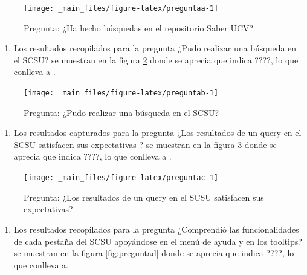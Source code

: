 \documentclass[
  12pt,
  openany]{book}
\providecommand{\tightlist}{%
  \setlength{\itemsep}{0pt}\setlength{\parskip}{0pt}}
\begin{document}
\begin{figure}

{\centering \texttt{[image: \_main\_files/figure-latex/preguntaa-1]} 

}

\caption{Pregunta: ¿Ha hecho búsquedas en el repositorio Saber UCV?}\label{fig:preguntaa}
\end{figure}

\begin{enumerate}
\def\labelenumi{\arabic{enumi}.}
\setcounter{enumi}{1}
\tightlist
\item
  Los resultados recopilados para la pregunta ¿Pudo realizar una búsqueda en el SCSU? se muestran en la figura \ref{fig:preguntab} donde se aprecia que indica ????, lo que conlleva a .
\end{enumerate}

\begin{figure}

{\centering \texttt{[image: \_main\_files/figure-latex/preguntab-1]} 

}

\caption{Pregunta: ¿Pudo realizar una búsqueda en el SCSU?}\label{fig:preguntab}
\end{figure}

\begin{enumerate}
\def\labelenumi{\arabic{enumi}.}
\setcounter{enumi}{2}
\tightlist
\item
  Los resultados capturados para la pregunta ¿Los resultados de un query en el SCSU satisfacen sus expectativas ? se muestran en la figura \ref{fig:preguntac} donde se aprecia que indica ????, lo que conlleva a .
\end{enumerate}

\begin{figure}

{\centering \texttt{[image: \_main\_files/figure-latex/preguntac-1]} 

}

\caption{Pregunta: ¿Los resultados de un query en el SCSU satisfacen sus expectativas? }\label{fig:preguntac}
\end{figure}

\begin{enumerate}
\def\labelenumi{\arabic{enumi}.}
\setcounter{enumi}{3}
\tightlist
\item
  Los resultados recopilados para la pregunta ¿Comprendió las funcionalidades de cada pestaña del SCSU apoyándose en el menú de ayuda y en los tooltips? se muestran en la figura \ref{fig:preguntad} donde se aprecia que indica ????, lo que conlleva a.
\end{enumerate}
\end{document}
